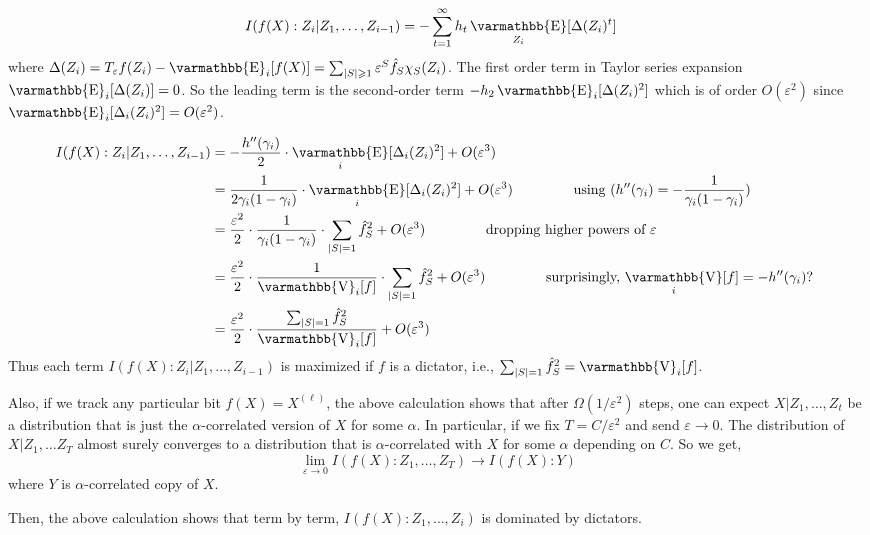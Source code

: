 \documentclass
[12pt,letterpaper]
{article}
\theoremstyle{definition}
\theoremstyle{remark}
\let\mathbb\varmathbb
\newcommand{\Esymb}{\mathbb{E}}
\newcommand{\Vsymb}{\mathbb{V}}
\DeclareMathOperator*{\E}{\Esymb}
\DeclareMathOperator*{\Var}{\Vsymb}
\renewcommand{\geq}{\geqslant}
\let\epsilon=\varepsilon
\numberwithin{equation}{section}
\begin{document}
\begin{align*}
I(f(X) : Z_i | Z_1,\ldots, Z_{i-1}) & = -\sum_{t = 1}^{\infty} h_t \E_{Z_i}[ \Delta(Z_i)^t] 
 \end{align*}
where $\Delta(Z_i) = T_{\epsilon} f(Z_i) - \E_i [f(X)] = \sum_{|S| \geq 1} \epsilon^{S} \hat{f}_S \chi_S(Z_i)$.  The first order term in Taylor series expansion $\E_i [\Delta(Z_i)] = 0$.  So the leading term is the second-order term $- h_2 \E_i[\Delta(Z_i)^2]$ which is of order $O(\epsilon^2)$ since $\E_i[\Delta_i (Z_i)^2] = O(\epsilon^2)$.

\begin{align*}
I(f(X) : Z_i | Z_1,\ldots, Z_{i-1}) & = - \frac{h''(\gamma_i)}{2} \cdot \E_i[\Delta_i (Z_i)^2] + O(\epsilon^3) \\
	& = \frac{1}{2\gamma_i (1-\gamma_i)} \cdot \E_i[\Delta_i (Z_i)^2] + O(\epsilon^3) \qquad \qquad \text{ using } (h''(\gamma_i) = -\frac{1}{\gamma_i(1-\gamma_i)})\\
 & = \frac{\epsilon^2}{2} \cdot \frac{1}{\gamma_i(1-\gamma_i)} \cdot \sum_{|S|=1}  \hat{f}_{S}^2  + O(\epsilon^3) \qquad \qquad \text{ dropping higher powers of $\epsilon$ }\\
 & = \frac{\epsilon^2}{2} \cdot \frac{1}{\Var_i[f]} \cdot \sum_{|S|=1}  \hat{f}_{S}^2  + O(\epsilon^3) \qquad \qquad \text{ surprisingly, $\Var_i[f] = -h''(\gamma_i)$? }\\
  &  = \frac{\epsilon^2}{2} \cdot \frac{\sum_{|S|=1}  \hat{f}_{S}^2 }{\Var_i [f]}  + O(\epsilon^3)
\end{align*} 
Thus each term $I(f(X):Z_i | Z_1,\ldots, Z_{i-1})$ is maximized if $f$ is a dictator, i.e., $\sum_{|S| = 1} \hat{f}_S^2 = \Var_i [f]$.  

Also, if we track any particular bit $f(X) = X^{(\ell)}$, the above calculation shows that after $\Omega(1/\epsilon^2)$ steps, one can expect $X|Z_1,\ldots,Z_t$ be a distribution that is just the $\alpha$-correlated version of $X$ for some $\alpha$.
%
In particular, if we fix $T = C/\epsilon^2$ and send $\epsilon \to 0$.   The distribution of $X| Z_1,\ldots Z_T$ almost surely converges to a distribution that is $\alpha$-correlated with $X$ for some $\alpha$ depending on $C$.  So we get,
$$ \lim_{\epsilon \to 0} I(f(X):Z_1,\ldots,Z_T) \to I(f(X):Y)$$
where $Y$ is $\alpha$-correlated copy of $X$.  

Then, the above calculation shows that term by term, $I(f(X):Z_1,\ldots,Z_i)$ is dominated by dictators.

\fi

\iffalse
\end{document}
